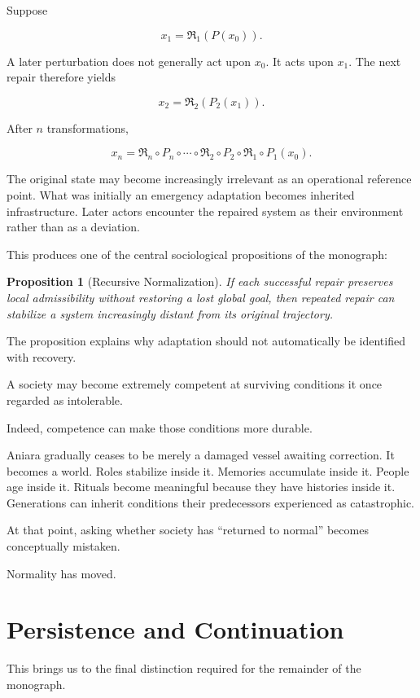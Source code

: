 \documentclass[11pt,oneside]{book}
\newtheorem{proposition}[theorem]{Proposition}
\theoremstyle{definition}
\theoremstyle{remark}
\newcommand{\Repair}{\mathfrak{R}}
\begin{document}
Suppose

\[
x_1=\Repair_1(P(x_0)).
\]

A later perturbation does not generally act upon \(x_0\). It acts upon \(x_1\). The next repair therefore yields

\[
x_2=\Repair_2(P_2(x_1)).
\]

After \(n\) transformations,

\[
x_n
=
\Repair_n
\circ P_n
\circ\cdots\circ
\Repair_2
\circ P_2
\circ
\Repair_1
\circ P_1(x_0).
\]

The original state may become increasingly irrelevant as an operational reference point. What was initially an emergency adaptation becomes inherited infrastructure. Later actors encounter the repaired system as their environment rather than as a deviation.

This produces one of the central sociological propositions of the monograph:

\begin{proposition}[Recursive Normalization]
If each successful repair preserves local admissibility without restoring a lost global goal, then repeated repair can stabilize a system increasingly distant from its original trajectory.
\end{proposition}

The proposition explains why adaptation should not automatically be identified with recovery.

A society may become extremely competent at surviving conditions it once regarded as intolerable.

Indeed, competence can make those conditions more durable.

Aniara gradually ceases to be merely a damaged vessel awaiting correction. It becomes a world. Roles stabilize inside it. Memories accumulate inside it. People age inside it. Rituals become meaningful because they have histories inside it. Generations can inherit conditions their predecessors experienced as catastrophic.

At that point, asking whether society has ``returned to normal'' becomes conceptually mistaken.

Normality has moved.

\section{Persistence and Continuation}

This brings us to the final distinction required for the remainder of the monograph.
\end{document}
